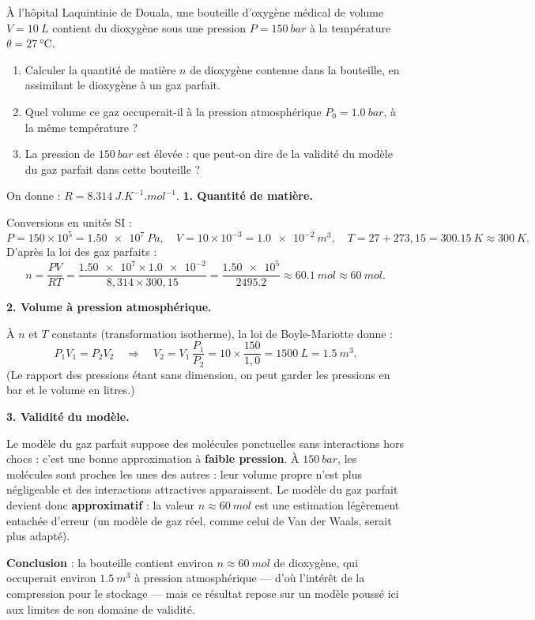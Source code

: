 \documentclass[11pt]{article}
\begin{document}
\begin{exoresolu}
À l'hôpital Laquintinie de Douala, une bouteille d'oxygène médical de volume $V = \SI{10}{L}$ contient du dioxygène sous une pression $P = \SI{150}{bar}$ à la température $\theta = \SI{27}{\celsius}$.
\begin{enumerate}
\item Calculer la quantité de matière $n$ de dioxygène contenue dans la bouteille, en assimilant le dioxygène à un gaz parfait.
\item Quel volume ce gaz occuperait-il à la pression atmosphérique $P_0 = \SI{1,0}{bar}$, à la même température ?
\item La pression de $\SI{150}{bar}$ est élevée : que peut-on dire de la validité du modèle du gaz parfait dans cette bouteille ?
\end{enumerate}
On donne : $R = \SI{8,314}{J.K^{-1}.mol^{-1}}$.
\tcblower
\textbf{1. Quantité de matière.}

Conversions en unités SI :
\[ P = 150 \times 10^5 = \SI{1,50e7}{Pa}, \quad V = 10 \times 10^{-3} = \SI{1,0e-2}{m^3}, \quad T = 27 + 273,15 = \SI{300,15}{K} \approx \SI{300}{K}. \]
D'après la loi des gaz parfaits :
\[ n = \dfrac{PV}{RT} = \dfrac{\num{1,50e7} \times \num{1,0e-2}}{8,314 \times 300,15} = \dfrac{\num{1,50e5}}{\num{2495,2}} \approx \SI{60,1}{mol} \approx \SI{60}{mol}. \]

\textbf{2. Volume à pression atmosphérique.}

À $n$ et $T$ constants (transformation isotherme), la loi de Boyle-Mariotte donne :
\[ P_1V_1 = P_2V_2 \quad \Longrightarrow \quad V_2 = V_1\,\dfrac{P_1}{P_2} = 10 \times \dfrac{150}{1,0} = \SI{1500}{L} = \SI{1,5}{m^3}. \]
(Le rapport des pressions étant sans dimension, on peut garder les pressions en bar et le volume en litres.)

\textbf{3. Validité du modèle.}

Le modèle du gaz parfait suppose des molécules ponctuelles sans interactions hors chocs : c'est une bonne approximation à \textbf{faible pression}. À $\SI{150}{bar}$, les molécules sont proches les unes des autres : leur volume propre n'est plus négligeable et des interactions attractives apparaissent. Le modèle du gaz parfait devient donc \textbf{approximatif} : la valeur $n \approx \SI{60}{mol}$ est une estimation légèrement entachée d'erreur (un modèle de gaz réel, comme celui de Van der Waals, serait plus adapté).

\textbf{Conclusion} : la bouteille contient environ $n \approx \SI{60}{mol}$ de dioxygène, qui occuperait environ $\SI{1,5}{m^3}$ à pression atmosphérique — d'où l'intérêt de la compression pour le stockage — mais ce résultat repose sur un modèle poussé ici aux limites de son domaine de validité.
\end{exoresolu}
\end{document}
